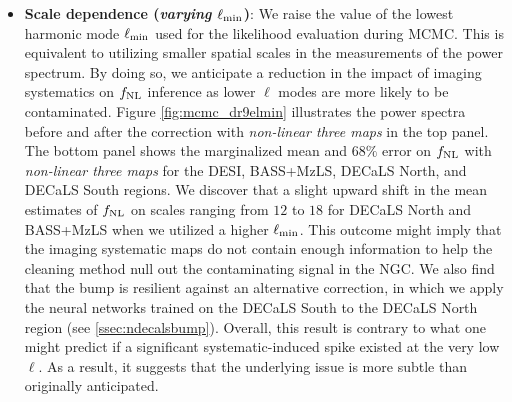 \begin{itemize}[itemindent=*]
\item \textbf{Scale dependence (\textit{varying $\ell_{\rm min}$})}: We raise the value of the lowest harmonic mode $\ell_{\rm min}$ used for the likelihood evaluation during MCMC. This is equivalent to utilizing smaller spatial scales in the measurements of the power spectrum. By doing so, we anticipate a reduction in the impact of imaging systematics on $f_{\rm NL}$ inference as lower $\ell$ modes are more likely to be contaminated. Figure \ref{fig:mcmc_dr9elmin} illustrates the power spectra before and after the correction with \textit{non-linear three maps} in the top panel. The bottom panel shows the marginalized mean and $68\%$ error on $f_{\rm NL}$ with \textit{non-linear three maps} for the DESI, BASS+MzLS, DECaLS North, and DECaLS South regions. We discover that a slight upward shift in the mean estimates of $f_{\rm NL}$ on scales ranging from $12$ to $18$ for DECaLS North and BASS+MzLS when we utilized a higher $\ell_{\rm min}$. This outcome might imply that the imaging systematic maps do not contain enough information to help the cleaning method null out the contaminating signal in the NGC. We also find that the bump is resilient against an alternative correction, in which we apply the neural networks trained on the DECaLS South to the DECaLS North region (see \ref{ssec:ndecalsbump}). Overall, this result is contrary to what one might predict if a significant systematic-induced spike existed at the very low $\ell$. As a result, it suggests that the underlying issue is more subtle than originally anticipated.

\end{itemize}

